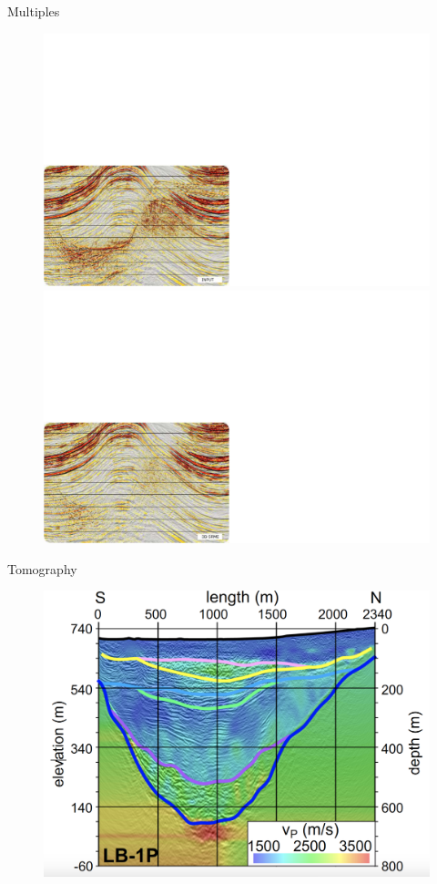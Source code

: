 \documentclass[xcolor=dvipsnames,notes]{beamer}
\begin{document}
\begin{frame}{Multiples}
\begin{figure}
  \includegraphics[width=0.5\linewidth]{Fig/ch6-srme1.pdf}
  \includegraphics[width=0.5\linewidth]{Fig/ch6-srme2.pdf}
\end{figure}
\end{frame}
\begin{frame}{Tomography}
\begin{figure}
  \includegraphics[width=\textwidth]{Fig/tomo.png}
\end{figure}
\end{frame}
\end{document}
